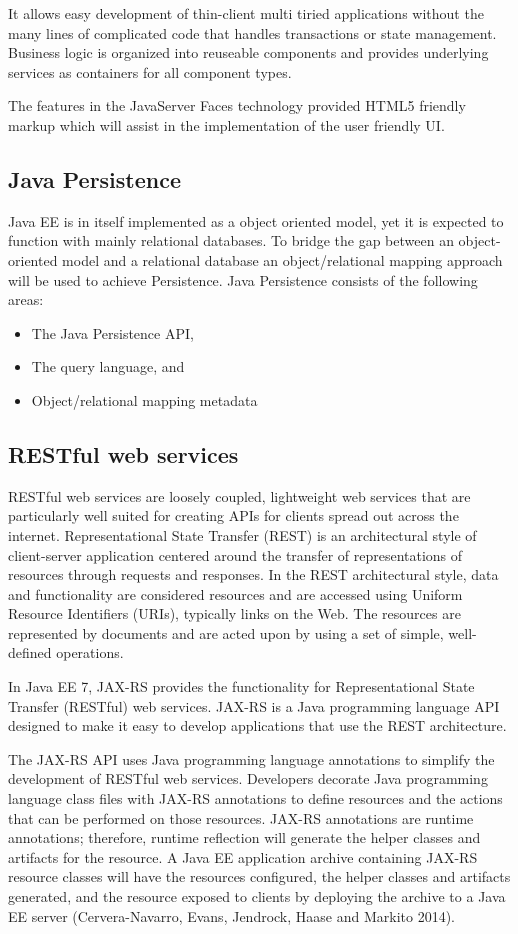 \documentclass[12pt]{article}
\begin{document}
It allows easy development of thin-client multi tiried applications without the many lines of complicated code that handles transactions or state management. Business logic is organized into reuseable components and provides underlying services as containers for all component types.

The features in the JavaServer Faces technology provided HTML5 friendly markup which will assist in the implementation of the user friendly UI.

\subsection{Java Persistence}
Java EE is in itself implemented as a object oriented model, yet it is expected to function with mainly relational databases. To bridge the gap between an object-oriented model and a relational database an object/relational mapping approach will be used to achieve Persistence. Java Persistence consists of the following areas:
\begin{itemize}
\item The Java Persistence API,
\item The query language, and
\item Object/relational mapping metadata
\end{itemize}

\subsection{RESTful web services}
RESTful web services are loosely coupled, lightweight web services that are particularly well suited for creating APIs for clients spread out across the internet. Representational State Transfer (REST) is an architectural style of client-server application centered around the transfer of representations of resources through requests and responses. In the REST architectural style, data and functionality are considered resources and are accessed using Uniform Resource Identifiers (URIs), typically links on the Web. The resources are represented by documents and are acted upon by using a set of simple, well-defined operations.

In Java EE 7, JAX-RS provides the functionality for Representational State Transfer (RESTful) web services. JAX-RS is a Java programming language API designed to make it easy to develop applications that use the REST architecture.

The JAX-RS API uses Java programming language annotations to simplify the development of RESTful web services. Developers decorate Java programming language class files with JAX-RS annotations to define resources and the actions that can be performed on those resources. JAX-RS annotations are runtime annotations; therefore, runtime reflection will generate the helper classes and artifacts for the resource. A Java EE application archive containing JAX-RS resource classes will have the resources configured, the helper classes and artifacts generated, and the resource exposed to clients by deploying the archive to a Java EE server (Cervera-Navarro, Evans, Jendrock, Haase and Markito 2014).
\end{document}
